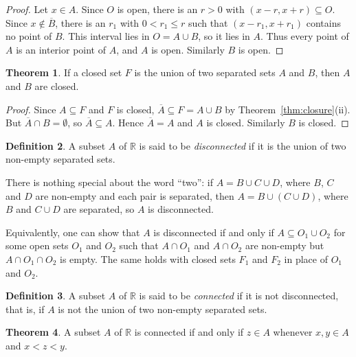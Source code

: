\documentclass[11pt,a4paper]{article}
\numberwithin{equation}{section}
\theoremstyle{definition}
\newtheorem{thm}{Theorem}[subsection]
\newtheorem{defn}[thm]{Definition}
\begin{document}
\begin{proof}
Let $x \in A$. Since $O$ is open, there is an $r>0$ with $(x - r, x + r)\subseteq O$. Since $x\notin\overline{B}$, there is an $r_1$ with $0<r_1 \leq r$ such that $(x - r_1, x + r_1)$ contains no point of $B$. This interval lies in $O = A\cup B$, so it lies in $A$. Thus every point of $A$ is an interior point of $A$, and $A$ is open. Similarly $B$ is open.
\end{proof}


\begin{thm}
If a closed set $F$ is the union of two separated sets $A$ and $B$, then $A$ and $B$ are closed.
\end{thm}

\begin{proof}
Since $A\subseteq F$ and $F$ is closed, $\overline{A}\subseteq F = A\cup B$ by Theorem~\ref{thm:closure}(ii). But $\overline{A}\cap B = \emptyset$, so $\overline{A} \subseteq A$. Hence $\overline{A} = A$ and $A$ is closed. Similarly $B$ is closed.
\end{proof}


\begin{defn}
A subset $A$ of $\mathbb{R}$ is said to be \emph{disconnected} if it is the union of two non-empty separated sets.

There is nothing special about the word ``two'': if $A = B\cup C\cup D$, where $B$, $C$ and $D$ are non-empty and each pair is separated, then $A = B\cup ( C\cup D)$, where $B$ and $C\cup D$ are separated, so $A$ is disconnected.

Equivalently, one can show that $A$ is disconnected if and only if $A\subseteq O_1 \cup O_2$ for some open sets $O_1$ and $O_2$ such that $A\cap O_1$ and $A\cap O_2$ are non-empty but $A\cap O_1 \cap O_2$ is empty. The same holds with closed sets $F_1$ and $F_2$ in place of $O_1$ and $O_2$.
\end{defn}


\begin{defn}
A subset $A$ of $\mathbb{R}$ is said to be \emph{connected} if it is not disconnected, that is, if $A$ is not the union of two non-empty separated sets.
\end{defn}


\begin{thm}\label{thm:intervalprop}
A subset $A$ of $\mathbb{R}$ is connected if and only if $z\in A$ whenever $x,y \in A$ and $x < z < y$.
\end{thm}
\end{document}
